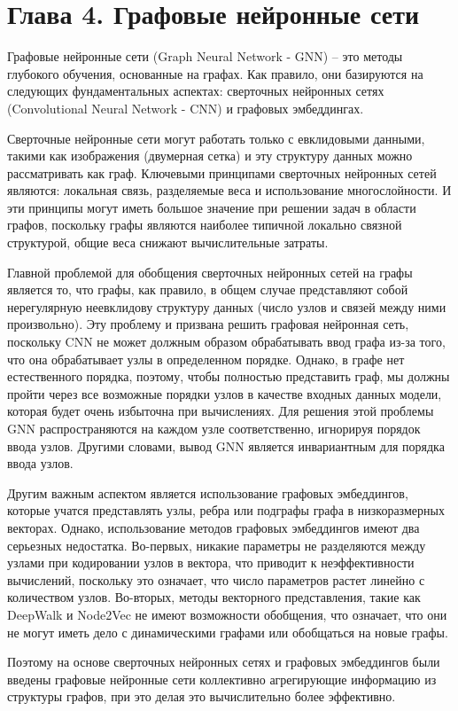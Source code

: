 \section{Глава 4. Графовые нейронные сети}
Графовые нейронные сети (Graph Neural Network - GNN) -- это методы глубокого обучения, основанные на графах. Как правило, они базируются на следующих фундаментальных аспектах: сверточных нейронных сетях (Convolutional Neural Network - CNN) и графовых эмбеддингах. 

Сверточные нейронные сети могут работать только с евклидовыми данными, такими как изображения (двумерная сетка) и эту структуру данных можно рассматривать как граф. Ключевыми принципами сверточных нейронных сетей являются: локальная связь, разделяемые веса и использование многослойности. И эти принципы могут иметь большое значение при решении задач в области графов, поскольку графы являются наиболее типичной локально связной структурой, общие веса снижают вычислительные затраты. 

Главной проблемой для обобщения сверточных нейронных сетей на графы является то, что графы, как правило, в общем случае представляют собой нерегулярную неевклидову структуру данных (число узлов и связей между ними произвольно). Эту проблему и призвана решить графовая нейронная сеть, поскольку CNN не может должным образом обрабатывать ввод графа из-за того, что она обрабатывает  узлы в определенном порядке. Однако, в графе нет естественного порядка, поэтому, чтобы полностью представить граф, мы должны пройти через все возможные порядки узлов в качестве входных данных модели, которая будет очень избыточна при вычислениях. Для решения этой проблемы GNN распространяются на каждом узле соответственно, игнорируя порядок ввода узлов. Другими словами, вывод GNN является инвариантным для порядка ввода узлов. 

Другим важным аспектом является использование графовых эмбеддингов, которые учатся представлять узлы, ребра или подграфы графа в низкоразмерных векторах. Однако, использование методов графовых эмбеддингов имеют два серьезных недостатка. Во-первых, никакие параметры не разделяются между узлами при кодировании узлов в вектора, что приводит к неэффективности вычислений, поскольку это означает, что число параметров растет линейно с количеством узлов. Во-вторых, методы векторного представления, такие как DeepWalk и Node2Vec не имеют возможности обобщения, что означает, что они не могут иметь дело с динамическими графами или обобщаться на новые графы.

Поэтому на основе сверточных нейронных сетях и графовых эмбеддингов были введены графовые нейронные сети коллективно агрегирующие информацию из структуры графов, при это делая это вычислительно более эффективно.

